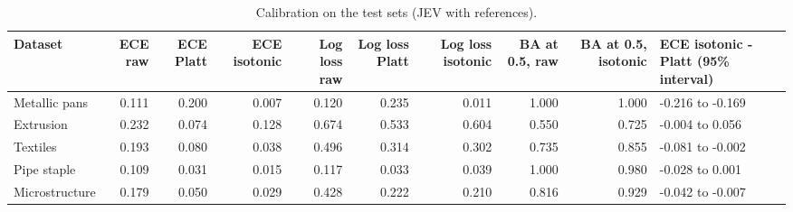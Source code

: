 \begin{table}

\caption{\label{tab:tbl-calibration}Calibration on the test sets (JEV with references).}
\centering
\begin{tabular}[t]{lrrrrrrrrl}
\toprule
Dataset & ECE raw & ECE Platt & ECE isotonic & Log loss raw & Log loss Platt & Log loss isotonic & BA at 0.5, raw & BA at 0.5, isotonic & ECE isotonic - Platt (95\% interval)\\
\midrule
Metallic pans & 0.111 & 0.200 & 0.007 & 0.120 & 0.235 & 0.011 & 1.000 & 1.000 & -0.216 to -0.169\\
Extrusion & 0.232 & 0.074 & 0.128 & 0.674 & 0.533 & 0.604 & 0.550 & 0.725 & -0.004 to 0.056\\
Textiles & 0.193 & 0.080 & 0.038 & 0.496 & 0.314 & 0.302 & 0.735 & 0.855 & -0.081 to -0.002\\
Pipe staple & 0.109 & 0.031 & 0.015 & 0.117 & 0.033 & 0.039 & 1.000 & 0.980 & -0.028 to 0.001\\
Microstructure & 0.179 & 0.050 & 0.029 & 0.428 & 0.222 & 0.210 & 0.816 & 0.929 & -0.042 to -0.007\\
\bottomrule
\end{tabular}
\end{table}
